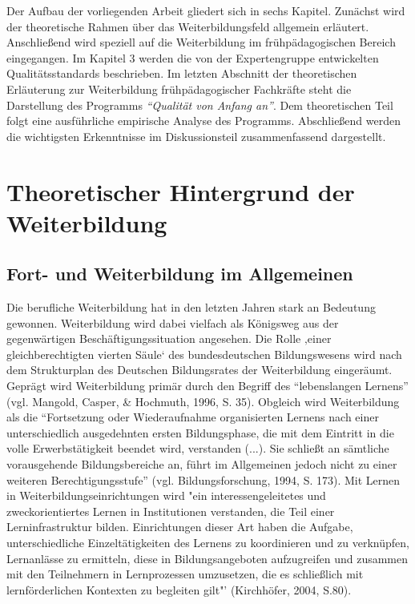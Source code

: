 \documentclass[12pt,a4paper]{article}
\begin{document}
	Der Aufbau der vorliegenden Arbeit gliedert sich in sechs Kapitel. Zunächst wird der theoretische Rahmen über das Weiterbildungsfeld allgemein erläutert. Anschließend wird speziell auf die Weiterbildung im frühpädagogischen Bereich eingegangen. Im Kapitel 3 werden die von der Expertengruppe entwickelten Qualitätsstandards  beschrieben. Im letzten Abschnitt der theoretischen Erläuterung zur Weiterbildung frühpädagogischer Fachkräfte steht die Darstellung des Programms \textit{"`Qualität von Anfang an"'}. Dem theoretischen Teil folgt eine ausführliche empirische Analyse des Programms. Abschließend werden die wichtigsten Erkenntnisse im Diskussionsteil zusammenfassend dargestellt. 

\section{Theoretischer Hintergrund der Weiterbildung}

\subsection{Fort- und Weiterbildung im Allgemeinen}

Die berufliche Weiterbildung hat in den letzten Jahren stark an Bedeutung gewonnen. Weiterbildung wird dabei vielfach als Königsweg aus der gegenwärtigen Beschäftigungssituation angesehen. Die Rolle ‚einer gleichberechtigten vierten Säule‘ des bundesdeutschen Bildungswesens wird  nach dem Strukturplan des Deutschen Bildungsrates der Weiterbildung eingeräumt. Geprägt wird Weiterbildung primär durch den Begriff des "`lebenslangen Lernens"' (vgl. Mangold, Casper, \& Hochmuth, 1996, S. 35). Obgleich wird Weiterbildung als die "`Fortsetzung oder Wiederaufnahme organisierten Lernens nach einer unterschiedlich ausgedehnten ersten Bildungsphase, die mit dem Eintritt in die volle Erwerbstätigkeit beendet wird, verstanden (...). Sie schließt an sämtliche vorausgehende Bildungsbereiche an, führt im Allgemeinen jedoch nicht zu einer weiteren Berechtigungsstufe"' (vgl. Bildungsforschung, 1994, S. 173). Mit Lernen in Weiterbildungseinrichtungen wird "ein interessengeleitetes und zweckorientiertes Lernen in Institutionen verstanden, die Teil einer Lerninfrastruktur bilden. Einrichtungen dieser Art haben die Aufgabe, unterschiedliche Einzeltätigkeiten des Lernens zu koordinieren und zu verknüpfen, Lernanlässe zu ermitteln, diese in Bildungsangeboten aufzugreifen und zusammen mit den Teilnehmern in Lernprozessen umzusetzen, die es schließlich mit lernförderlichen Kontexten zu begleiten gilt"' (Kirchhöfer, 2004, S.80). 
\end{document}
